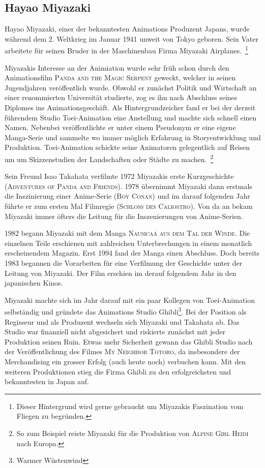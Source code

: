 \subsection{Hayao Miyazaki}
Hayao Miyazaki, einer der bekanntesten Animations Produzent Japans, wurde während dem 2. Weltkrieg im Januar 1941 unweit von Tokyo geboren. Sein Vater arbeitete für seinen Bruder in der Maschinenbau Firma Miyazaki Airplanes.~\footnote{Dieser Hintergrund wird gerne gebraucht um Miyazakis Faszination vom Fliegen zu begründen.} 

Miyazakis Interesse an der Animiation wurde sehr früh schon durch den Animationsfilm \textsc{Panda and the Magic Serpent} geweckt, welcher in seinen Jugendjahren veröffentlich wurde. Obwohl er zunächst Politik und Wirtschaft an einer renommierten Universität studierte, zog es ihn nach Abschluss seines Diplomes ins Animationsgeschäft. Als Hintergrundzeicher fand er bei der derzeit führendem Studio Toei-Animation eine Anstellung und machte sich schnell einen Namen. Nebenbei veröffentlichte er unter einem Pseudonym er eine eigene Manga-Serie und sammelte wo immer möglich Erfahrung in Storyentwicklung und Produktion. Toei-Animation schickte seine Animatoren gelegentlich auf Reisen um um Skizzenstudien der Landschaften oder Städte zu machen.~\footnote{So zum Beispiel reiste Miyazaki für die Produktion von \textsc{Alpine Girl Heidi} nach Europa.} 

Sein Freund Isao Takahata verfilmte 1972 Miyazakis erste Kurzgeschichte (\textsc{Adventures of Panda and Friends}). 1978 übernimmt Miyazaki dann erstmals die Inszinierung einer Anime-Serie (\textsc{Boy Conan}) und im darauf folgenden Jahr führte er zum ersten Mal Filmregie (\textsc{Schloss des Caliostro}). Von da an bekam Miyazaki immer öfters die Leitung für die Inszenierungen von Anime-Serien.

1982 begann Miyazaki mit dem Manga \textsc{Nausicaä aus dem Tal der Winde}. Die einzelnen Teile erschienen mit zahlreichen Unterbrechungen in einem monatlich erscheinendem Magazin. Erst 1994 fand der Manga einen Abschluss. Doch bereits 1983 begannen die Vorarbeiten für eine Verfilmung der Geschichte unter der Leitung von Miyazaki. Der Film erschien im derauf folgendem Jahr in den japanischen Kinos. 

Miyazaki machte sich im Jahr darauf mit ein paar Kollegen von Toei-Animation selbständig und gründete das Animations Studio Ghibli\footnote{Warmer Wüstenwind}. Bei der Position als Regisseur und als Produzent wechseln sich Miyazaki und Takahata ab. Das Studio war finanziell nicht abgesichert und riskierte zunächst mit jeder Produktion seinen Ruin. Etwas mehr Sicherheit gewann das Ghibli Studio nach der Veröffentlichung des Filmes \textsc{My Neighbor Totoro}, da insbesondere der Merchandising ein grosser Erfolg (auch heute noch) verbuchen kann. Mit den weiteren Produktionen stieg die Firma Ghibli zu den erfolgreichsten und bekanntesten in Japan auf.

